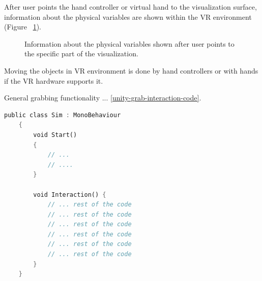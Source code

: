 After user points the hand controller or virtual hand to the visualization surface, information about the physical variables are shown within the VR environment (Figure~ \ref{fig:pointer-interaction}).

\begin{figure}[!ht]
	\centering
	\qquad
	\captionsetup{justification=centering}
	\caption{Information about the physical variables shown after user points to the specific part of the visualization.}
	\label{fig:pointer-interaction}
\end{figure}

Moving the objects in VR environment is done by hand controllers or with hands if the VR hardware supports it. 

General grabbing functionality ... \ref{unity-grab-interaction-code}.

\begin{lstlisting}[language=Rust, caption="Grab interaction code.", label=unity-grab-interaction-code]
	public class Sim : MonoBehaviour
	{
		void Start()
		{
			// ...
			// ....
		}
		
		void Interaction() {
			// ... rest of the code
			// ... rest of the code
			// ... rest of the code
			// ... rest of the code
			// ... rest of the code
			// ... rest of the code
		}
	}
\end{lstlisting}

